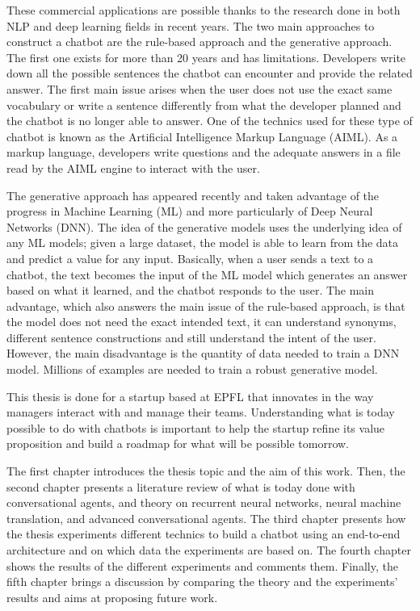 These commercial applications are possible thanks to the research done in both NLP and deep learning fields in recent years. The two main approaches to construct a chatbot are the rule-based approach and the generative approach.
The first one exists for more than 20 years and has limitations. Developers write down all the possible sentences the chatbot can encounter and provide the related answer. The first main issue arises when the user does not use the exact same vocabulary or write a sentence differently from what the developer planned and the chatbot is no longer able to answer.
One of the technics used for these type of chatbot is known as the Artificial Intelligence Markup Language (AIML). As a markup language, developers write questions and the adequate answers in a file read by the AIML engine to interact with the user.

The generative approach has appeared recently and taken advantage of the progress in Machine Learning (ML) and more particularly of Deep Neural Networks (DNN). The idea of the generative models uses the underlying idea of any ML models; given a large dataset, the model is able to learn from the data and predict a value for any input.
Basically, when a user sends a text to a chatbot, the text becomes the input of the ML model which generates an answer based on what it learned, and the chatbot responds to the user.
The main advantage, which also answers the main issue of the rule-based approach, is that the model does not need the exact intended text, it can understand synonyms, different sentence constructions and still understand the intent of the user.
However, the main disadvantage is the quantity of data needed to train a DNN model. Millions of examples are needed to train a robust generative model.

This thesis is done for a startup based at EPFL that innovates in the way managers interact with and manage their teams.
Understanding what is today possible to do with chatbots is important to help the startup refine its value proposition and build a roadmap for what will be possible tomorrow.

The first chapter introduces the thesis topic and the aim of this work. Then, the second chapter presents a literature review of what is today done with conversational agents, and theory on recurrent neural networks, neural machine translation, and advanced conversational agents.
The third chapter presents how the thesis experiments different technics to build a chatbot using an end-to-end architecture and on which data the experiments are based on. The fourth chapter shows the results of the different experiments and comments them.
Finally, the fifth chapter brings a discussion by comparing the theory and the experiments' results and aims at proposing future work.
